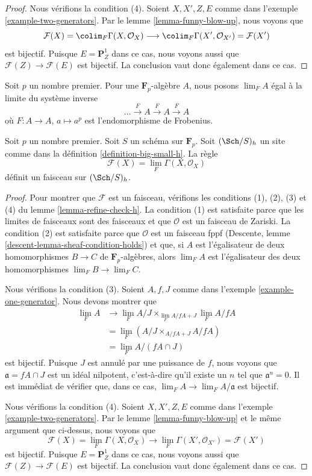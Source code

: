 \begin{proof}
\medskip\noindent
Nous vérifions la condition (4). Soient $X, X', Z, E$ comme dans
l'exemple \ref{example-two-generators}. Par le
lemme \ref{lemma-funny-blow-up}, nous voyons que
$$
\mathcal{F}(X) = \colim_F \Gamma(X, \mathcal{O}_X)
\longrightarrow
\colim_F \Gamma(X', \mathcal{O}_{X'}) = \mathcal{F}(X')
$$
est bijectif. Puisque $E = \mathbf{P}^1_Z$ dans ce cas, nous
voyons aussi que $\mathcal{F}(Z) \to \mathcal{F}(E)$ est bijectif.
La conclusion vaut donc également dans ce cas.
\end{proof}

\noindent
Soit $p$ un nombre premier. Pour une $\mathbf{F}_p$-algèbre $A$,
nous posons $\lim_F A$ égal à la limite du système inverse
$$
\ldots \xrightarrow{F} A \xrightarrow{F} A \xrightarrow{F} A
$$
où $F : A \to A$, $a \mapsto a^p$ est l'endomorphisme de Frobenius.

\begin{lemma}
\label{lemma-h-sheaf-lim-F}
Soit $p$ un nombre premier. Soit $S$ un schéma sur $\mathbf{F}_p$.
Soit $(\Sch/S)_h$ un site comme dans la définition \ref{definition-big-small-h}.
La règle
$$
\mathcal{F}(X) = \lim_F \Gamma(X, \mathcal{O}_X)
$$
définit un faisceau sur $(\Sch/S)_h$.
\end{lemma}

\begin{proof}
Pour montrer que $\mathcal{F}$ est un faisceau, vérifions les conditions
(1), (2), (3) et (4) du lemme \ref{lemma-refine-check-h}.
La condition (1) est satisfaite parce que les limites de faisceaux sont des faisceaux
et que $\mathcal{O}$ est un faisceau de Zariski. La condition (2) est satisfaite parce que
$\mathcal{O}$ est un faisceau fppf (Descente, lemme
\ref{descent-lemma-sheaf-condition-holds}) et que, si $A$ est l'égalisateur
de deux homomorphismes $B \to C$ de $\mathbf{F}_p$-algèbres, alors $\lim_F A$
est l'égalisateur des deux homomorphismes $\lim_F B \to \lim_F C$.

\medskip\noindent
Nous vérifions la condition (3). Soient $A, f, J$ comme dans
l'exemple \ref{example-one-generator}.
Nous devons montrer que
\begin{align*}
\lim_F A
& \to
\lim_F A/J \times_{\lim_F A/fA + J} \lim_F A/fA \\
& =
\lim_F (A/J \times_{A/fA + J} A/fA) \\
& =
\lim_F A/(fA \cap J)
\end{align*}
est bijectif. Puisque $J$ est annulé par une puissance de $f$, nous voyons que
$\mathfrak a = fA \cap J$ est un idéal nilpotent, c'est-à-dire qu'il existe un
$n$ tel que $\mathfrak a^n = 0$. Il est immédiat
de vérifier que, dans ce cas, $\lim_F A \to \lim_F A/\mathfrak a$
est bijectif.

\medskip\noindent
Nous vérifions la condition (4). Soient $X, X', Z, E$ comme dans
l'exemple \ref{example-two-generators}. Par le
lemme \ref{lemma-funny-blow-up} et le même argument que ci-dessus,
nous voyons que
$$
\mathcal{F}(X) = \lim_F \Gamma(X, \mathcal{O}_X)
\longrightarrow
\lim_F \Gamma(X', \mathcal{O}_{X'}) = \mathcal{F}(X')
$$
est bijectif. Puisque $E = \mathbf{P}^1_Z$ dans ce cas, nous
voyons aussi que $\mathcal{F}(Z) \to \mathcal{F}(E)$ est bijectif.
La conclusion vaut donc également dans ce cas.
\end{proof}

